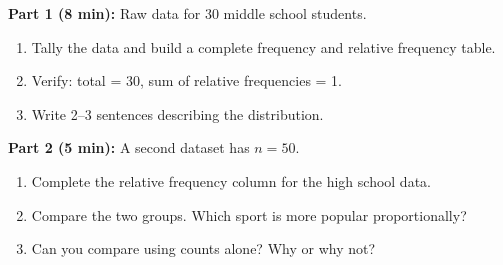 \documentclass[aspectratio=169, 11pt]{beamer}
\begin{document}
{
\begin{frame}[t, plain]
  \vspace{1.2cm}\par
  \hspace{0.55cm}%
  \begin{minipage}{0.9\textwidth}
    \small

    \textbf{Part 1 (8 min):} Raw data for 30 middle school students.
    \begin{enumerate}
      \setlength{\itemsep}{0.3em}
      \item Tally the data and build a complete frequency and relative frequency table.
      \item Verify: total = 30, sum of relative frequencies = 1.
      \item Write 2--3 sentences describing the distribution.
    \end{enumerate}

    \vspace{0.5cm}
    \textbf{Part 2 (5 min):} A second dataset has $n = 50$.
    \begin{enumerate}
      \setlength{\itemsep}{0.3em}
      \item Complete the relative frequency column for the high school data.
      \item Compare the two groups. Which sport is more popular proportionally?
      \item Can you compare using counts alone? Why or why not?
    \end{enumerate}
  \end{minipage}
\end{frame}
}
\end{document}
